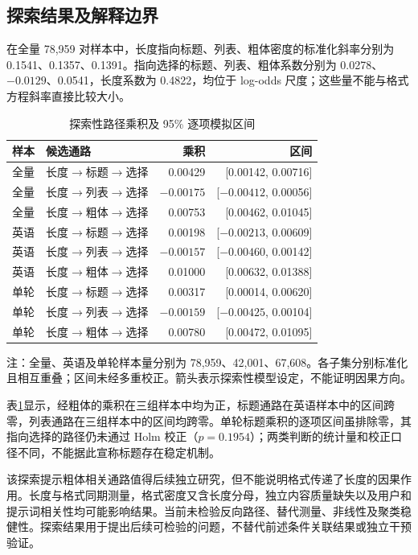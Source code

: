 \documentclass[UTF8,11pt,a4paper,fontset=windows]{ctexart}
\numberwithin{equation}{section}
\begin{document}
\subsection{探索结果及解释边界}
在全量 78,959 对样本中，长度指向标题、列表、粗体密度的标准化斜率分别为 0.1541、0.1357、0.1391。指向选择的标题、列表、粗体系数分别为 0.0278、$-0.0129$、0.0541，长度系数为 0.4822，均位于 log-odds 尺度；这些量不能与格式方程斜率直接比较大小。

\begin{table}[htbp]\centering\small
\caption{探索性路径乘积及 95\% 逐项模拟区间}\label{tab:paths}
\begin{tabular}{llrr}
\toprule
样本 & 候选通路 & 乘积 & 区间\\
\midrule
全量 & 长度$\to$标题$\to$选择 & 0.00429 & [0.00142, 0.00716]\\
全量 & 长度$\to$列表$\to$选择 & $-0.00175$ & [$-0.00412$, 0.00056]\\
全量 & 长度$\to$粗体$\to$选择 & 0.00753 & [0.00462, 0.01045]\\
英语 & 长度$\to$标题$\to$选择 & 0.00198 & [$-0.00213$, 0.00609]\\
英语 & 长度$\to$列表$\to$选择 & $-0.00157$ & [$-0.00460$, 0.00142]\\
英语 & 长度$\to$粗体$\to$选择 & 0.01000 & [0.00632, 0.01388]\\
单轮 & 长度$\to$标题$\to$选择 & 0.00317 & [0.00014, 0.00620]\\
单轮 & 长度$\to$列表$\to$选择 & $-0.00159$ & [$-0.00425$, 0.00104]\\
单轮 & 长度$\to$粗体$\to$选择 & 0.00780 & [0.00472, 0.01095]\\
\bottomrule
\end{tabular}
\par\smallskip\footnotesize 注：全量、英语及单轮样本量分别为 78,959、42,001、67,608。各子集分别标准化且相互重叠；区间未经多重校正。箭头表示探索性模型设定，不能证明因果方向。
\end{table}

表\ref{tab:paths}显示，经粗体的乘积在三组样本中均为正，标题通路在英语样本中的区间跨零，列表通路在三组样本中的区间均跨零。单轮标题乘积的逐项区间虽排除零，其指向选择的路径仍未通过 Holm 校正（$p=0.1954$）；两类判断的统计量和校正口径不同，不能据此宣称标题存在稳定机制。

该探索提示粗体相关通路值得后续独立研究，但不能说明格式传递了长度的因果作用。长度与格式同期测量，格式密度又含长度分母，独立内容质量缺失以及用户和提示词相关性均可能影响结果。当前未检验反向路径、替代测量、非线性及聚类稳健性。探索结果用于提出后续可检验的问题，不替代前述条件关联结果或独立干预验证。
\end{document}
